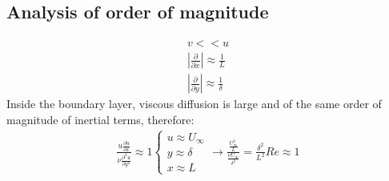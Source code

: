 \documentclass[class=report, crop=false, 12pt,a4paper]{standalone}
\begin{document}
\subsection{Analysis of order of magnitude}
\begin{align}
  v << u\\
  \left| \frac{\partial}{\partial x} \right| \approx \frac{1}{L}\\
  \left| \frac{\partial}{\partial y} \right| \approx \frac{1}{\delta}
\end{align}
Inside the boundary layer, viscous diffusion is large and of the same order of magnitude of inertial terms, therefore:
\begin{align}
  \frac{u\frac{\partial u}{\partial x}}{\nu\frac{\partial^2 u}{\partial y^2}} \approx 1 \begin{cases}
    u\approx U_\infty\\
    y \approx \delta\\
    x \approx L
  \end{cases} \rightarrow \frac{\frac{U_\infty^2}{L}}{\frac{\nu U_\infty}{\delta^2}} = \frac{\delta^2}{L^2} Re \approx 1
\end{align}
\end{document}
